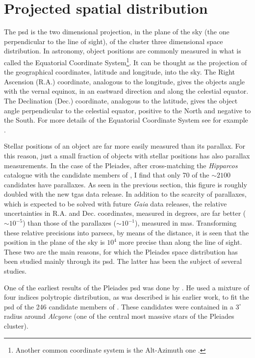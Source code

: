 \section{Projected spatial distribution}
\label{sect:PSD}
The \gls{psd} is the two dimensional projection, in the plane of the sky (the one perpendicular to the line of sight), of the cluster three dimensional space distribution. In astronomy, object positions are commonly measured in what is called the Equatorial Coordinate System\footnote{Another common coordinate system is the Alt-Azimuth one \cite[see][]{Smart1977}.}. It can be thought as the projection of the geographical coordinates, latitude and longitude, into the sky. The Right Ascension (R.A.) coordinate, analogous to the longitude, gives the objects angle with the vernal equinox, in an eastward direction and along the celestial equator. The Declination (Dec.) coordinate, analogous to the latitude, gives the object angle perpendicular to the celestial equator, positive to the North and negative to the South. For more details of the Equatorial Coordinate System see for example \citet{Smart1977}. 

{Stellar positions of an object are far more easily measured than its parallax. For this reason, just a small fraction of objects with stellar positions has also parallax measurements. In the case of the Pleiades, after cross-matching the \emph{Hipparcos} catalogue \citep{1997A&A...323L..49P} with the candidate members of \citet{Bouy2015}, I find that only 70 of the $\sim2100$ candidates have parallaxes. As seen in the previous section, this figure is roughly doubled with the new \gls{tgas} \citep{2016A&A...595A...1G} data release. In addition to the scarcity of parallaxes, which is expected to be solved with future \emph{Gaia} data releases, the relative uncertainties in R.A. and Dec. coordinates, measured in degrees, are far better ($\sim 10^{-5}$) than those of the parallaxes ($\sim10^{-1}$), measured in mas. Transforming these relative precisions into parsecs, by means of the distance, it is seen that the position in the plane of the sky is $10^4$ more precise than along the line of sight.  These two are the main reasons, for which the Pleiades space distribution has been studied mainly through its \gls{psd}. The latter has been the subject of several studies. }

One of the earliest results of the Pleiades \gls{psd} was done by \citet{Limber1962}. He used a mixture of four indices polytropic distribution, as was described is his earlier \citet{Limber1961} work, to fit the \gls{psd} of the 246 candidate members of \citet{Trumpler1921}. These candidates were contained in a $3^{\circ}$ radius around \emph{Alcyone} (one of the central most massive stars of the Pleiades cluster). 

